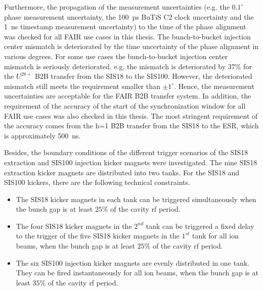 Furthermore, the propagation of the measurement uncertainties (e.g. the $0.1^\circ$ phase measurement uncertainty, the \SI{100}{ps} BuTiS C2 clock uncertainty and the \SI{1}{ns} timestamp measurement uncertainty) to the time of the phase alignment was checked for all FAIR use cases in this thesis. The bunch-to-bucket injection center mismatch is deteriorated by the time uncertainty of the phase alignment in various degrees. For some use cases the bunch-to-bucket injection center mismatch is seriously deteriorated. e.g. the mismatch is deteriorated by $37\%$ for the $U^\mathit{28+}$ B2B transfer from the SIS18 to the SIS100. However, the deteriorated mismatch still meets the requirement smaller than $\pm1^\circ$. Hence, the measurement uncertainties are acceptable for the FAIR B2B transfer system. In addition, the requirement of the accuracy of the start of the synchronization window for all FAIR use cases was also checked in this thesis. The most stringent requirement of the accuracy comes from the h=1 B2B transfer from the SIS18 to the ESR, which is approximately \SI{500}{\ns}. 

Besides, the boundary conditions of the different trigger scenarios of the SIS18 extraction and SIS100 injection kicker magnets were investigated. The nine SIS18 extraction kicker magnets are distributed into two tanks. For the SIS18 and SIS100 kickers, there are the following technical constraints.
\begin{itemize}
	\item The SIS18 kicker magnets in each tank can be triggered simultaneously when the bunch gap is at least $25\%$ of the cavity rf period. 
	\item The four SIS18 kicker magnets in the $2^{nd}$ tank can be triggered a fixed delay to the trigger of the five SIS18 kicker magnets in the $1^{st}$ tank for all ion beams, when the bunch gap is at least $25\%$ of the cavity rf period. 
	\item The six SIS100 injection kicker magnets are evenly distributed in one tank. They can be fired instantaneously for all ion beams, when the bunch gap is at least $35\%$ of the cavity rf period.
\end{itemize}

